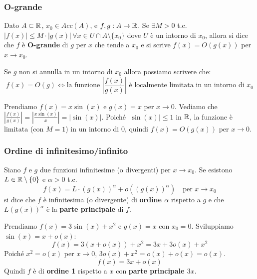 \subsubsection{O-grande}
\begin{definition}[O-grande]
    Dato $A \subset \mathbb{R}$, $x_0 \in Acc(A)$, e $f,g: A \to \mathbb{R}$. Se $\exists M > 0$ t.c. $|f(x)| \leq M \cdot |g(x)| \, \forall x \in U \cap A \setminus \{x_0\}$ dove $U$ è un intorno di $x_0$, allora si dice che $f$ è \textbf{O-grande} di $g$ per $x$ che tende a $x_0$ e si scrive $f(x) = O(g(x))$ per $x\to x_0$.
\end{definition}

\begin{observation}
Se $g$ non si annulla in un intorno di $x_0$ allora possiamo scrivere che:
$$ f(x) = O(g) \Longleftrightarrow \text{la funzione } \left|\frac{f(x)}{g(x)}\right| \text{ è localmente limitata in un intorno di } x_0 $$
\end{observation}

\begin{example}
    Prendiamo $f(x) = x\sin(x)$ e $g(x) = x$ per $x \to 0$.
    Vediamo che $|\frac{f(x)}{g(x)}| = |\frac{x\sin(x)}{x}| = |\sin(x)|$.
    Poiché $|\sin(x)| \leq 1$ in $\mathbb{R}$, la funzione è limitata (con $M=1$) in un intorno di 0, quindi $f(x) = O(g(x))$ per $x\to 0$.
\end{example}

\subsubsection{Ordine di infinitesimo/infinito}
\begin{definition}
    Siano $f$ e $g$ due funzioni infinitesime (o divergenti) per $x\to x_0$. Se esistono $L \in \mathbb{R} \setminus \{0\}$ e $\alpha > 0$ t.c.
    $$ f(x) = L \cdot (g(x))^\alpha + o((g(x))^\alpha) \quad \text{per } x\to x_0 $$
    si dice che $f$ è infinitesima (o divergente) di \textbf{ordine $\alpha$} rispetto a $g$ e che $L(g(x))^\alpha$ è la \textbf{parte principale} di $f$.
\end{definition}

\begin{example}
    Prendiamo $f(x) = 3\sin(x) + x^2$ e $g(x) = x$ con $x_0 = 0$.
    Sviluppiamo $\sin(x) = x + o(x)$:
    $$ f(x) = 3(x + o(x)) + x^2 = 3x + 3o(x) + x^2 $$
    Poiché $x^2 = o(x)$ per $x \to 0$, $3o(x) + x^2 = o(x) + o(x) = o(x)$.
    $$ f(x) = 3x + o(x) $$
    Quindi $f$ è di \textbf{ordine 1} rispetto a $x$ con \textbf{parte principale $3x$}.
\end{example}

